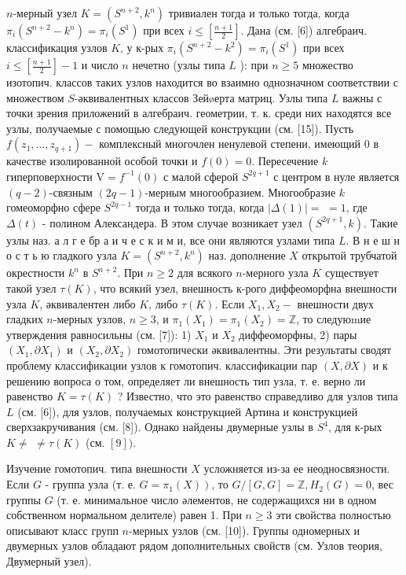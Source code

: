 \documentclass[10pt]{article}
\begin{document}
$n$-мерный узел $K=\left(S^{n+2}, k^{n}\right)$ тривиален тогда и только тогда, когда $\pi_{i}\left(S^{n+2}-k^{n}\right)=\pi_{i}\left(S^{1}\right)$ при всех $i \leqslant\left[\frac{n+1}{2}\right]$. Дана (см. [6]) алгебраич. классификация узлов $K$, у к-рых $\pi_{i}\left(S^{n+2}-k^{2}\right)=\pi_{i}\left(S^{1}\right)$ при всех $i \leqslant\left[\frac{n+1}{2}\right]-1$ и число $n$ нечетно (узлы типа $L$ ): при $n \geqslant 5$ множество изотопич. классов таких узлов находится во взаимно однозначном соответствии с множеством $S$-әквивалентных классов Зейøерта матриц. Узлы типа $L$ важны с точки зрения приложений в алгебраич. геометрии, т. к. среди них находятся все узлы, получаемые с помощью следующей конструкции (см. [15]). Пусть $f\left(z_{1}, \ldots, z_{q+1}\right)-$ комплексный многочлен ненулевой степени, имеющий 0 в качестве изолированной особой точки и $f(0)=0$. Пересечение $k$ гиперповерхности $\mathrm{V}=f^{-1}(0)$ с малой сферой $S^{2 q+1}$ с центром в нуле является $(q-2)$-связным $(2 q-1)$-мерным многообразием. Многообразие $k$ гомеоморфно сфере $S^{2 q-1}$ тогда и только тогда, когда $|\Delta(1)|=$ $=1$, где $\Delta(t)$ - полином Александера. В этом случае возникает узел $\left(S^{2 q+1}, k\right)$. Такие узлы наз. а л г е бр а и ч е с к и м и, все они являются узлами типа $L$. В н е ш н о с т ь ю гладкого узла $K=\left(S^{n+2}, k^{n}\right)$ наз. дополнение $X$ открытой трубчатой окрестности $k^{n}$ в $S^{n+2}$. При $n \geqslant 2$ для всякого $n$-мерного узла $K$ существует такой узел $\tau(K)$, что всякий узел, внешность к-рого диффеоморфна внешности узла $K$, әквивалентен либо $K$, либо $\tau(K)$. Если $X_{1}, X_{2}-$ внешности двух гладких $n$-мерных узлов, $n \geqslant 3$, и $\pi_{1}\left(X_{1}\right)=\pi_{1}\left(X_{2}\right)=\mathbb{Z}$, то следуюmие утверждения равносильны (см. [7]): 1) $X_{1}$ и $X_{2}$ диффеоморфны, 2) пары $\left(X_{1}, \partial X_{1}\right)$ и $\left(X_{2}, \partial X_{2}\right)$ гомотопически әквивалентны. Эти результаты сводят проблему классификации узлов к гомотопич. классификации пар $(X, \partial X)$ и к решению вопроса о том, определяет ли внешность тип узла, т. е. верно ли равенство $K=\tau(K)$ ? Известно, что это равенство справедливо для узлов типа $L$ (см. [6]), для узлов, получаемых конструкцией Артина и конструкцией сверхзакручивания (см. [8]). Однако найдены двумерные узлы в $S^{4}$, для к-рых $K \neq$ $\neq \tau(K)$ (см. $[9])$.



Изучение гомотопич. типа внешности $X$ усложняется из-за ее неодносвязности. Если $G$ - группа узла (т. е. $\left.G=\pi_{1}(X)\right)$, то $G /[G, G]=\mathbb{Z}, H_{2}(G)=0$, вес группы $G$ (т. е. минимальное число әлементов, не содержащихся ни в одном собственном нормальном делителе) равен 1. При $n \geqslant 3$ эти свойства полностью описывают класс групп $n$-мерных узлов (см. [10]). Группы одномерных и двумерных узлов обладают рядом дополнительных свойств (см. Узлов теория, Двумерный узел).
\end{document}
